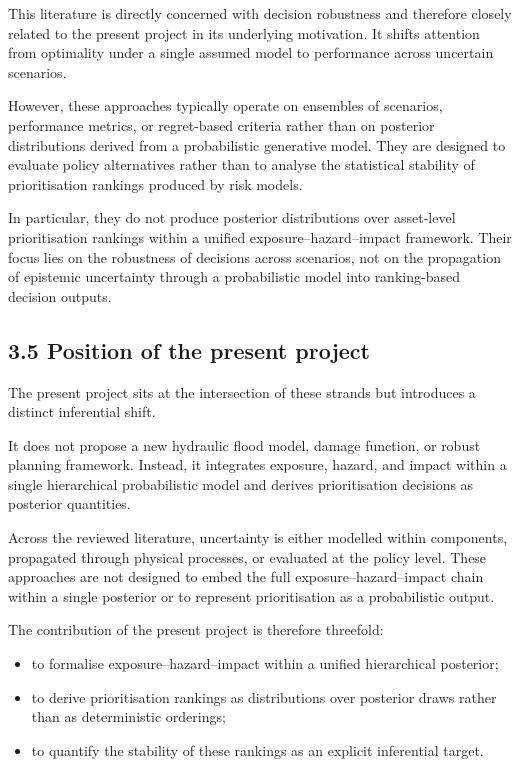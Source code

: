 \documentclass[
]{article}
\providecommand{\tightlist}{%
  \setlength{\itemsep}{0pt}\setlength{\parskip}{0pt}}
\begin{document}
This literature is directly concerned with decision robustness and
therefore closely related to the present project in its underlying
motivation. It shifts attention from optimality under a single assumed
model to performance across uncertain scenarios.

However, these approaches typically operate on ensembles of scenarios,
performance metrics, or regret-based criteria rather than on posterior
distributions derived from a probabilistic generative model. They are
designed to evaluate policy alternatives rather than to analyse the
statistical stability of prioritisation rankings produced by risk
models.

In particular, they do not produce posterior distributions over
asset-level prioritisation rankings within a unified
exposure--hazard--impact framework. Their focus lies on the robustness
of decisions across scenarios, not on the propagation of epistemic
uncertainty through a probabilistic model into ranking-based decision
outputs.

\subsection{3.5 Position of the present
project}\label{position-of-the-present-project}

The present project sits at the intersection of these strands but
introduces a distinct inferential shift.

It does not propose a new hydraulic flood model, damage function, or
robust planning framework. Instead, it integrates exposure, hazard, and
impact within a single hierarchical probabilistic model and derives
prioritisation decisions as posterior quantities.

Across the reviewed literature, uncertainty is either modelled within
components, propagated through physical processes, or evaluated at the
policy level. These approaches are not designed to embed the full
exposure--hazard--impact chain within a single posterior or to represent
prioritisation as a probabilistic output.

The contribution of the present project is therefore threefold:

\begin{itemize}
\tightlist
\item
  to formalise exposure--hazard--impact within a unified hierarchical
  posterior;
\item
  to derive prioritisation rankings as distributions over posterior
  draws rather than as deterministic orderings;
\item
  to quantify the stability of these rankings as an explicit inferential
  target.
\end{itemize}
\end{document}
